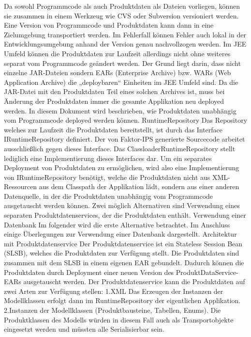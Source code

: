 Da sowohl Programmcode als auch Produktdaten als Dateien vorliegen, können sie zusammen in einem Werkzeug wie CVS oder Subversion versioniert werden. Eine Version von Programmcode und Produktdaten kann dann in eine Zielumgebung transportiert werden. Im Fehlerfall können Fehler auch lokal in der Entwicklungsumgebung anhand der Version genau nachvollzogen werden.
Im JEE Umfeld können die Produktdaten zur Laufzeit allerdings nicht ohne weiteres separat vom Programmcode geändert werden. Der Grund liegt darin, dass nicht einzelne JAR-Dateien sondern EARs (Enterprise Archive) bzw. WARs (Web Application Archive) die „deploybaren“ Einheiten im JEE Umfeld sind. Da die JAR-Datei mit den Produktdaten Teil eines solchen Archives ist, muss bei Änderung der Produktdaten immer die gesamte Applikation neu deployed werden. 
In diesem Dokument wird beschrieben, wie Produktdaten unabhängig vom Programmcode deployed werden können.
RuntimeRepository
Das Repository welches zur Laufzeit die Produktdaten bereitstellt, ist durch das Interface IRuntimeRepository definiert. Der von Faktor-IPS generierte Sourcecode arbeitet ausschließlich gegen dieses Interface. Das ClassloaderRuntimeRepository stellt lediglich eine Implementierung dieses Interfaces dar. Um ein separates Deployment von Produktdaten zu ermöglichen, wird also eine Implementierung von IRuntimeRepository benötigt, welche die Produktdaten nicht aus XML-Ressourcen aus dem Classpath der Applikation lädt, sondern aus einer anderen Datenquelle, in der die Produktdaten unabhängig vom Programmcode ausgetauscht werden können. Zwei möglich Alternativen sind
Verwendung eines separaten Produktdatenservices, der die Produktdaten enthält.
Verwendung einer Datenbank
Im folgender wird die erste Alternative betrachtet. Im Anschluss einige Überlegungen zur Verwendung einer Datenbank dargestellt. 
Architektur mit Produktdatenservice
Der Produktdatenservice ist ein Stateless Session Bean (SLSB), welches die Produktdaten zur Verfügung stellt. Die Produktdaten sind zusammen mit dem SLSB in einem eigenen EAR gebundelt. Dadurch können die Produktdaten durch Deployment einer neuen Version des ProduktDataService-EARs ausgetauscht werden. 
Der Produktdatenservice kann die Produktdaten auf zwei Arten zur Verfügung stellen:
1.XML
Das Erzeugen der Instanzen der Modellklassen erfolgt dann im RuntimeRepository der eigentlichen Applikation.
2.Instanzen der Modellklassen (Produktbausteine, Tabellen, Enums).
Die Produktklassen des Modells würden in diesem Fall auch als Transportobjekte eingesetzt werden und müssten alle Serialisierbar sein. 

